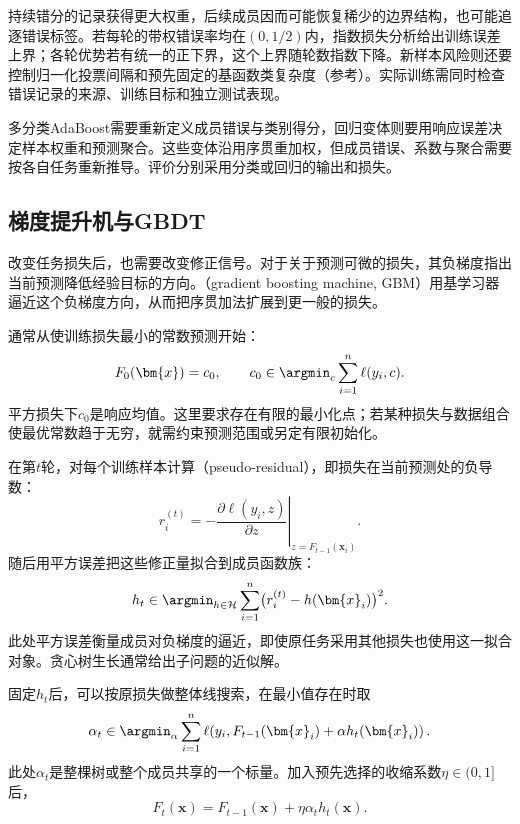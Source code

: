 持续错分的记录获得更大权重，后续成员因而可能恢复稀少的边界结构，也可能追逐错误标签。若每轮的带权错误率均在$(0,1/2)$内，指数损失分析给出训练误差上界；各轮优势若有统一的正下界，这个上界随轮数指数下降。新样本风险则还要控制归一化投票间隔和预先固定的基函数类复杂度（参考）。实际训练需同时检查错误记录的来源、训练目标和独立测试表现。

多分类AdaBoost需要重新定义成员错误与类别得分，回归变体则要用响应误差决定样本权重和预测聚合。这些变体沿用序贯重加权，但成员错误、系数与聚合需要按各自任务重新推导。评价分别采用分类或回归的输出和损失。

\subsection{梯度提升机与GBDT}
\label{sec:ensemble-gradient-boosting}

改变任务损失后，也需要改变修正信号。对于关于预测可微的损失，其负梯度指出当前预测降低经验目标的方向。（gradient boosting machine, GBM）用基学习器逼近这个负梯度方向，从而把序贯加法扩展到更一般的损失。

通常从使训练损失最小的常数预测开始：
\begin{equation}
  F_0(\bm{x})=c_0,
  \qquad
  c_0\in\argmin_c\sum_{i=1}^{n}\ell(y_i,c).
  \label{eq:ensemble-gbm-initialization}
\end{equation}
平方损失下$c_0$是响应均值。这里要求存在有限的最小化点；若某种损失与数据组合使最优常数趋于无穷，就需约束预测范围或另定有限初始化。

在第$t$轮，对每个训练样本计算（pseudo-residual），即损失在当前预测处的负导数：
\begin{equation}
  r_i^{(t)}
  =
  -
  \left.
  \frac{\partial \ell(y_i,z)}{\partial z}
  \right|_{z=F_{t-1}(\bm{x}_i)}.
  \label{eq:ensemble-pseudo-residual}
\end{equation}
随后用平方误差把这些修正量拟合到成员函数族：
\begin{equation}
  h_t\in\argmin_{h\in\mathcal{H}}
  \sum_{i=1}^{n}\bigl(r_i^{(t)}-h(\bm{x}_i)\bigr)^2.
  \label{eq:ensemble-gbm-gradient-fit}
\end{equation}
此处平方误差衡量成员对负梯度的逼近，即使原任务采用其他损失也使用这一拟合对象。贪心树生长通常给出子问题的近似解。

固定$h_t$后，可以按原损失做整体线搜索，在最小值存在时取
\begin{equation}
  \alpha_t\in\argmin_\alpha
  \sum_{i=1}^{n}
  \ell\!\left(y_i,F_{t-1}(\bm{x}_i)+\alpha h_t(\bm{x}_i)\right).
  \label{eq:ensemble-gbm-line-search}
\end{equation}
此处$\alpha_t$是整棵树或整个成员共享的一个标量。加入预先选择的收缩系数$\eta\in(0,1]$后，
\begin{equation}
  F_t(\bm{x})
  =
  F_{t-1}(\bm{x})
  +
  \eta\alpha_t h_t(\bm{x}).
  \label{eq:ensemble-gradient-boosting-update}
\end{equation}


